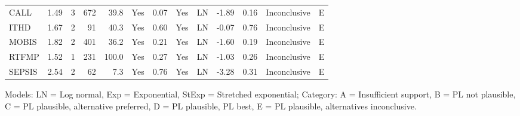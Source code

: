 \begin{tabular}{lrrrrcrclrrll}
CALL & 1.49 & 3 & 672 & 39.8 & Yes & 0.07 & Yes & LN & -1.89 & 0.16 & Inconclusive & \cellcolor[HTML]{56B4E9} E \\
ITHD & 1.67 & 2 & 91 & 40.3 & Yes & 0.60 & Yes & LN & -0.07 & 0.76 & Inconclusive & \cellcolor[HTML]{56B4E9} E \\
MOBIS & 1.82 & 2 & 401 & 36.2 & Yes & 0.21 & Yes & LN & -1.60 & 0.19 & Inconclusive & \cellcolor[HTML]{56B4E9} E \\
RTFMP & 1.52 & 1 & 231 & 100.0 & Yes & 0.27 & Yes & LN & -1.03 & 0.26 & Inconclusive & \cellcolor[HTML]{56B4E9} E \\
SEPSIS & 2.54 & 2 & 62 & 7.3 & Yes & 0.76 & Yes & LN & -3.28 & 0.31 & Inconclusive & \cellcolor[HTML]{56B4E9} E \\
\bottomrule
\end{tabular}
\begin{center}\footnotesize
Models: LN = Log normal, Exp = Exponential, StExp = Stretched exponential; \quad Category: A = Insufficient support, B = PL not plausible, C = PL plausible, alternative preferred, D = PL plausible, PL best, E = PL plausible, alternatives inconclusive.
\end{center}
